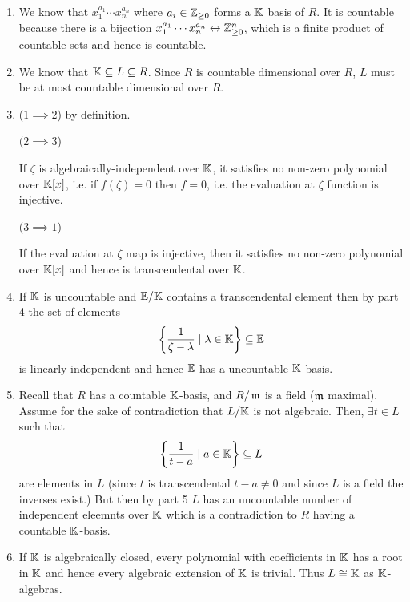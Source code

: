 \documentclass[Notebook.tex]{subfiles}
\begin{document}
\begin{solution}
    \bbni
    \begin{enumerate}
        \item We know that $x_1^{a_1} \cdots x_n^{a_n}$ where $a_i \in \mathbb Z_{\geq 0}$ forms a $\mathbb K$ basis of $R$. It is countable because there is a bijection $x_1^{a_1} \cdots x_n^{a_n} \leftrightarrow \mathbb Z_{\geq 0}^n$, which is a finite product of countable sets and hence is countable. 
        
        \item We know that $\mathbb K \subseteq L \subseteq R$. Since $R$ is countable dimensional over $R$, $L$ must be at most countable dimensional over $R$.
        
        \item ($1 \implies 2$) by definition. 
        
        $(2 \implies 3$)

        If $\zeta$ is algebraically-independent over $\mathbb K$, it satisfies no non-zero polynomial over $\mathbb K[x]$, i.e. if $f(\zeta) = 0$ then $f = 0$, i.e. the evaluation at $\zeta$ function is injective. 

        ($3 \implies 1$)

        If the evaluation at $\zeta$ map is injective, then it satisfies no non-zero polynomial over $\mathbb K[x]$ and hence is transcendental over $\mathbb K$. 

        
        \item If $\mathbb K$ is uncountable and $\mathbb E/\mathbb K$ contains a transcendental element then by part 4 the set of elements 
        \[\left\{ \frac{1}{\zeta - \lambda} \mid \lambda \in \mathbb K \right\} \subseteq \mathbb E\]
        is linearly independent and hence $\mathbb E$ has a uncountable $\mathbb K$ basis. 

        \item Recall that $R$ has a countable $\mathbb K$-basis, and $R/\operatorname{\mathfrak{m}}$ is a field ($\operatorname{\mathfrak{m}}$ maximal). Assume for the sake of contradiction that $L/\mathbb K$ is not algebraic. Then, $\exists t \in L$ such that  
        \[\left\{ \frac{1}{t - a} \mid a \in \mathbb K \right\} \subseteq L\]
        are elements in $L$ (since $t$ is transcendental $t-a \neq 0$ and since $L$ is a field the inverses exist.) But then by part 5 $L$ has an uncountable number of independent eleemnts over $\mathbb K$ which is a contradiction to $R$ having a countable $\mathbb K$-basis. 
        
        \item If $\mathbb K$ is algebraically closed, every polynomial with coefficients in $\mathbb K$ has a root in $\mathbb K$ and hence every algebraic extension of $\mathbb K$ is trivial. Thus $L \cong \mathbb K$ as $\mathbb K$-algebras. 
        

\end{enumerate}
\end{solution}
\end{document}

